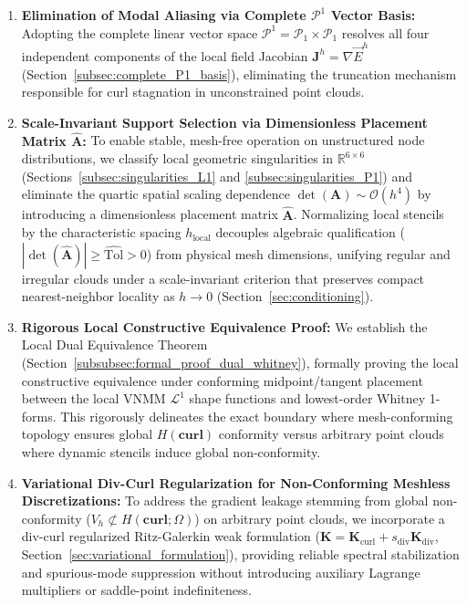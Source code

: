 \documentclass[preprint,12pt]{elsarticle}
\begin{document}
\begin{enumerate}
    \item \textbf{Elimination of Modal Aliasing via Complete $\mathcal{P}^1$ Vector Basis:}
          Adopting the complete linear vector space $\mathcal{P}^1 = \mathcal{P}_1 \times \mathcal{P}_1$ resolves all four independent components of the local field Jacobian $\mathbf{J}^h = \nabla \vec{E}^h$ (Section~\ref{subsec:complete_P1_basis}), eliminating the truncation mechanism responsible for curl stagnation in unconstrained point clouds.

    \item \textbf{Scale-Invariant Support Selection via Dimensionless Placement Matrix $\widehat{\mathbf{A}}$:}
          To enable stable, mesh-free operation on unstructured node distributions, we classify local geometric singularities in $\mathbb{R}^{6\times6}$ (Sections~\ref{subsec:singularities_L1} and \ref{subsec:singularities_P1}) and eliminate the quartic spatial scaling dependence $\det(\mathbf{A}) \sim \mathcal{O}(h^4)$ by introducing a dimensionless placement matrix $\widehat{\mathbf{A}}$. Normalizing local stencils by the characteristic spacing $h_{\mathrm{local}}$ decouples algebraic qualification ($|\det(\widehat{\mathbf{A}})| \ge \widehat{\mathrm{Tol}} > 0$) from physical mesh dimensions, unifying regular and irregular clouds under a scale-invariant criterion that preserves compact nearest-neighbor locality as $h \to 0$ (Section~\ref{sec:conditioning}).

    \item \textbf{Rigorous Local Constructive Equivalence Proof:}
          We establish the Local Dual Equivalence Theorem (Section~\ref{subsubsec:formal_proof_dual_whitney}), formally proving the local constructive equivalence under conforming midpoint/tangent placement between the local VNMM $\mathcal{L}^1$ shape functions and lowest-order Whitney 1-forms. This rigorously delineates the exact boundary where mesh-conforming topology ensures global $H(\mathbf{curl})$ conformity versus arbitrary point clouds where dynamic stencils induce global non-conformity.

    \item \textbf{Variational Div-Curl Regularization for Non-Conforming Meshless Discretizations:}
          To address the gradient leakage stemming from global non-conformity ($V_h \not\subset H(\mathbf{curl}; \Omega)$) on arbitrary point clouds, we incorporate a div-curl regularized Ritz-Galerkin weak formulation ($\mathbf{K} = \mathbf{K}_{\mathrm{curl}} + s_{\mathrm{div}} \mathbf{K}_{\mathrm{div}}$, Section~\ref{sec:variational_formulation}), providing reliable spectral stabilization and spurious-mode suppression without introducing auxiliary Lagrange multipliers or saddle-point indefiniteness.
\end{enumerate}
\end{document}
